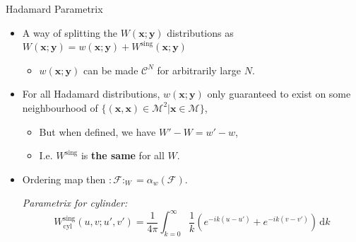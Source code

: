 \documentclass[pdf, fleqn, compress, handout]{beamer}
\newcommand{\nord}[1]{\boldsymbol{:}\!#1\!\boldsymbol{:}}
\newcommand{\ourex}[1]{{\itshape\color{viridian!70!black}#1}}
\begin{document}
\begin{frame}{Hadamard Parametrix}
	\begin{itemize}
		\item	A way of splitting the $W(\mathbf{x}; \mathbf{y})$ distributions as
				$
					W(\mathbf{x}; \mathbf{y})
						=
					w(\mathbf{x}; \mathbf{y}) + 
					W^\mathrm{sing}(\mathbf{x}; \mathbf{y})
				$
		\begin{itemize}
			\item	$w(\mathbf{x}; \mathbf{y})$ can be made $\mathcal{C}^N$ for arbitrarily large $N$.
		\end{itemize}
		\pause
		\item	For all Hadamard distributions,
				$w(\mathbf{x}; \mathbf{y})$
				only guaranteed to exist on some neighbourhood of
				$
					\{(\mathbf{x}, \mathbf{x}) \in \mathcal{M}^2
						|
					\mathbf{x} \in \mathcal{M}\}
				$,
		\begin{itemize}
			\item	But when defined, we have $W' - W = w' - w$,
			\item	I.e. $W^\mathrm{sing}$ is \textbf{the same} for all $W$.
		\end{itemize}				
		\pause
		\item	Ordering map then $\nord{\mathcal{F}}_W = \alpha_{w}(\mathcal{F})$.
		\pause

		\vspace{1em}
		\ourex{
				Parametrix for cylinder:
				\begin{equation*}
					W^\mathrm{sing}_\mathrm{cyl}(u, v; u', v')
						=
					\frac{1}{4 \pi}
					\int_{k = 0}^\infty
						\frac{1}{k}
						\left( 
							e^{-ik(u - u')} +
							e^{-ik(v - v')}
						\right)
					\, \mathrm{d}k
				\end{equation*}
		}
	\end{itemize}
\end{frame}
\end{document}
